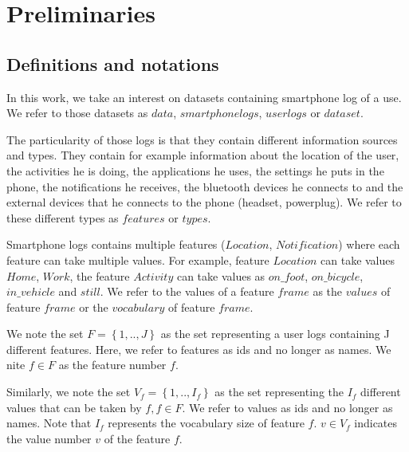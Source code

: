 
\chapter{Preliminaries} %

\label{Chapter2} %



\section{Definitions and notations}

In this work, we take an interest on datasets containing smartphone log of a use. We refer to those datasets as $data$, $smartphone logs$, $user logs$ or $dataset$.

The particularity of those logs is that they contain different information sources and types. They contain for example information about the location of the user, the activities he is doing, the applications he uses, the settings he puts in the phone, the notifications he receives, the bluetooth devices he connects to and the external devices that he connects to the phone (headset, powerplug).
We refer to these different types as $features$ or $types$.

Smartphone logs contains multiple features ($Location$, $Notification$) where each feature can take multiple values. For example, feature $Location$ can take values $Home$, $Work$, the feature $Activity$ can take values as $on\_foot$, $on\_bicycle$, $in\_vehicle$ and $still$. We refer to the values of a feature $frame$ as the $values$ of feature $frame$ or the $vocabulary$ of feature $frame$.

We note the set $F= \left \{ 1,.., J \right \}$ as the set representing a user logs containing J different features. Here, we refer to features as ids and no longer as names. We nite $f \in F$ as the feature number $f$.

Similarly, we note the set $V_f = \left \{ 1,.., I_f \right \} $ as the set representing the $I_f$ different values that can be taken by $f, f \in F$. We refer to values as ids and no longer as names. Note that $I_f$ represents the vocabulary size of feature $f$. $v \in V_f$ indicates the value number $v$ of the feature $f$.

